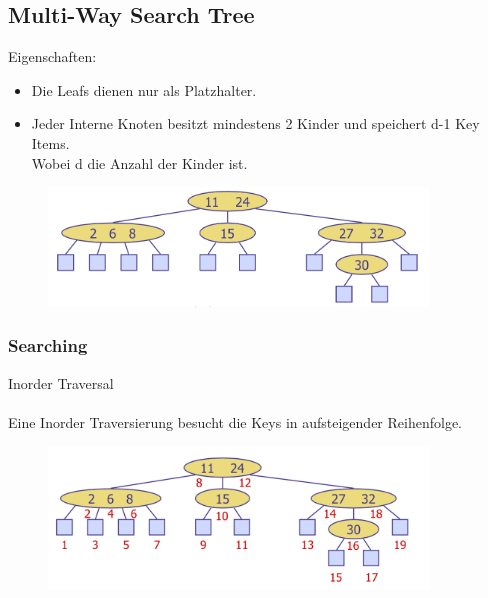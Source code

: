 \documentclass[a4paper,10pt]{report}
\begin{document}
\subsection{Multi-Way Search Tree}
Eigenschaften:
\begin{itemize}
	\item
	Die Leafs dienen nur als Platzhalter.
	\item
	Jeder Interne Knoten besitzt mindestens 2 Kinder und speichert d-1 Key Items.\\
	Wobei d die Anzahl der Kinder ist.
\end{itemize}
\begin{figure}[H]
	\begin{center}
  		\includegraphics[width=0.9\textwidth]{img/multiwaysearchtree.png}
	\end{center}
\end{figure}
\subsubsection{Searching}
Inorder Traversal\\
\\ 
Eine Inorder Traversierung besucht die Keys in aufsteigender Reihenfolge.
\begin{figure}[H]
	\begin{center}
  		\includegraphics[width=0.9\textwidth]{img/multiwaysearchtreeinorder.png}
	\end{center}
\end{figure}
\newpage
\end{document}

